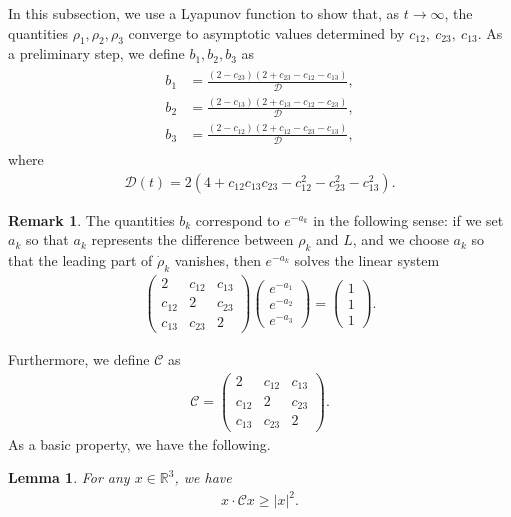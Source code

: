 \documentclass[reqno]{amsart}
\theoremstyle{plain}
\newtheorem{lemma}[theorem]{Lemma}
\theoremstyle{definition}
\newtheorem{remark}{Remark}[section]
\numberwithin{equation}{section}
\newcommand{\1}{\mathbbm{1}}
\begin{document}
In this subsection, we use a Lyapunov function to show that, as $t\to\infty$, the quantities $\rho_1,\rho_2,\rho_3$ converge to asymptotic values determined by $c_{12},\ c_{23},\ c_{13}$.
As a preliminary step, we define $b_1,b_2,b_3$ as
\begin{align}\label{bdef}
\begin{aligned}
b_1&=\frac{(2-c_{23})(2+c_{23}-c_{12}-c_{13})}{\mathcal{D}},
\\
b_2&=\frac{(2-c_{13})(2+c_{13}-c_{12}-c_{23})}{\mathcal{D}},
\\
b_3&=\frac{(2-c_{12})(2+c_{12}-c_{23}-c_{13})}{\mathcal{D}},
\end{aligned}
\end{align}
where 
\begin{align}\label{mathcalDdef}
\mathcal{D}(t)=2(4+c_{12}c_{13}c_{23}-c_{12}^2-c_{23}^2-c_{13}^2).
\end{align}
\begin{remark}
The quantities $b_k$ correspond to $e^{-a_k}$ in the following sense:
if we set $a_k$ so that $a_k$ represents the difference between $\rho_k$ and $L$,
and we choose $a_k$ so that the leading part of $\dot{\rho}_k$ vanishes, then $e^{-a_k}$ solves the linear system
\begin{align*}
\begin{pmatrix}
2&c_{12}&c_{13}
\\
c_{12}&2&c_{23}
\\
c_{13}&c_{23}&2
\end{pmatrix}
\begin{pmatrix}
e^{-a_1}
\\
e^{-a_2}
\\
e^{-a_3}
\end{pmatrix}
=
\begin{pmatrix}
1
\\
1
\\
1
\end{pmatrix}
.
\end{align*}
\end{remark}
Furthermore, we define $\mathcal{C}$ as
\begin{align}\label{mathcalCdef}
\mathcal{C}=
\begin{pmatrix}
2&c_{12}&c_{13}
\\
c_{12}&2&c_{23}
\\
c_{13}&c_{23}&2
\end{pmatrix}
.
\end{align}
As a basic property, we have the following.
\begin{lemma}\label{mathcalCpro1}
For any $x\in\mathbb{R}^3$, we have
\begin{align}\label{Cuku}
x\cdot \mathcal{C}x\geq |x|^2.
\end{align}
\end{lemma}
\end{document}
